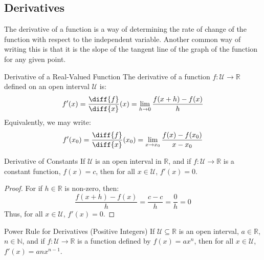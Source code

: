 \documentclass[crop=false,class=book,oneside]{standalone}                      %
\begin{document}
    \subsection{Derivatives}
        The derivative of a function is a way of determining
        the rate of change of the function with respect to
        the independent variable. Another common way of
        writing this is that it is the slope of the tangent
        line of the graph of the function for any given
        point.
        \begin{ldefinition}{Derivative of a Real-Valued Function}
            The derivative of a function
            $f:\mathcal{U}\rightarrow\mathbb{R}$
            defined on an open interval $\mathcal{U}$ is:
            \begin{equation}
                f'(x)
                =\frac{\diff{f}}{\diff{x}}(x)
                =\lim_{h\rightarrow{0}}\frac{f(x+h)-f(x)}{h}
            \end{equation}
            Equivalently, we may write:
            \begin{equation*}
                f'(x_{0})
                =\frac{\diff{f}}{\diff{x}}(x_{0})
                =\lim_{x\rightarrow{x_{0}}}
                \frac{f(x)-f(x_{0})}{x-x_{0}}
            \end{equation*}
        \end{ldefinition}
        \begin{ltheorem}{Derivative of Constants}
            If $\mathcal{U}$ is an open interval in
            $\mathbb{R}$, and if
            $f:\mathcal{U}\rightarrow\mathbb{R}$ is
            a constant function, $f(x)=c$, then
            for all $x\in\mathcal{U}$,
            $f'(x)=0$.
        \end{ltheorem}
        \begin{proof}
            For if $h\in\mathbb{R}$ is non-zero, then:
            \begin{equation}
                \frac{f(x+h)-f(x)}{h}
                =\frac{c-c}{h}
                =\frac{0}{h}
                =0
            \end{equation}
            Thus, for all $x\in\mathcal{U}$, $f'(x)=0$.
        \end{proof}
        \begin{ltheorem}{Power Rule for Derivatives (Positive Integers)}
            If $\mathcal{U}\subseteq\mathbb{R}$ is an open
            interval, $a\in\mathbb{R}$, $n\in\mathbb{N}$,
            and if $f:\mathcal{U}\rightarrow\mathbb{R}$
            is a function defined by $f(x)=ax^{n}$, then
            for all $x\in\mathcal{U}$, $f'(x)=anx^{n-1}$.
        \end{ltheorem}
\end{document}
